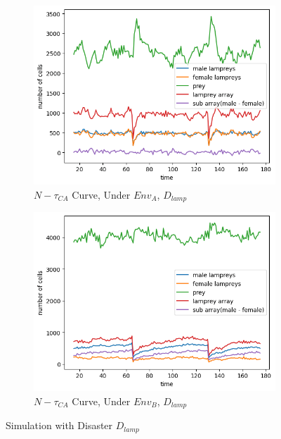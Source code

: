 \documentclass{mcmthesis}
\begin{document}
\begin{figure}[H]
  \centering
  \begin{subfigure}[b]{0.45\textwidth}
    \includegraphics[width=\textwidth]{figures/6_2_figur3.png}
    \caption{$N-\tau_{CA}$ Curve, Under $Env_{A}$, $D_{lamp}$}
    \label{fig:sub1}
  \end{subfigure}
  \hfill
  \begin{subfigure}[b]{0.45\textwidth}
    \includegraphics[width=\textwidth]{figures/6_2_figur4.png}
    \caption{$N-\tau_{CA}$ Curve, Under $Env_{B}$, $D_{lamp}$}
    \label{fig:sub2}
  \end{subfigure}

  
  \caption{Simulation with Disaster $D_{lamp}$}
  \label{fig:Simulation of Disaster}
\end{figure}
\end{document}
